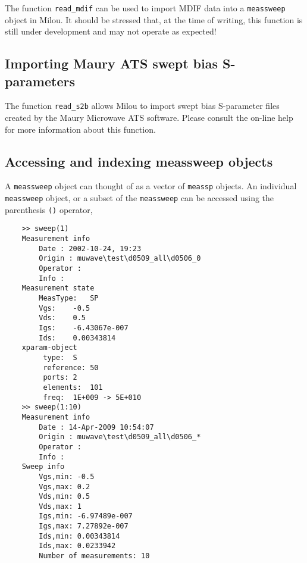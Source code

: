 The function \verb"read_mdif" can be used to import MDIF data into
a \verb"meassweep" object in Milou. It should be stressed that, at
the time of writing, this function is still under development and
may not operate as expected!

\subsection{Importing Maury ATS swept bias S-parameters}
The function \verb"read_s2b" allows Milou to import swept bias
S-parameter files created by the Maury Microwave ATS software.
Please consult the on-line help for more information about this
function.

\subsection{Accessing and indexing meassweep objects}
A \verb"meassweep" object can thought of as a vector of
\verb"meassp" objects. An individual \verb"meassweep" object, or a
subset of the \verb"meassweep" can be accessed using the
parenthesis \verb"()" operator,
\begin{small}
\begin{verbatim}
    >> sweep(1)
    Measurement info
        Date : 2002-10-24, 19:23
        Origin : muwave\test\d0509_all\d0506_0
        Operator :
        Info :
    Measurement state
    	MeasType:	SP
    	Vgs:	-0.5
    	Vds:	0.5
    	Igs:	-6.43067e-007
    	Ids:	0.00343814
    xparam-object
    	 type:	S
    	 reference:	50
    	 ports:	2
    	 elements:	101
    	 freq:	1E+009 -> 5E+010
    >> sweep(1:10)
    Measurement info
        Date : 14-Apr-2009 10:54:07
        Origin : muwave\test\d0509_all\d0506_*
        Operator :
        Info :
    Sweep info
    	Vgs,min: -0.5
    	Vgs,max: 0.2
    	Vds,min: 0.5
    	Vds,max: 1
    	Igs,min: -6.97489e-007
    	Igs,max: 7.27892e-007
    	Ids,min: 0.00343814
    	Ids,max: 0.0233942
    	Number of measurements: 10
\end{verbatim}
\end{small}

